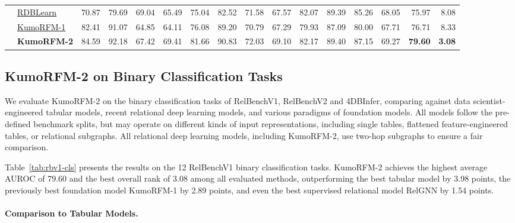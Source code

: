 \documentclass{article}
\newcommand{\onezero}{1\xspace}
\newcommand{\twozero}{2\xspace}
\newcommand{\name}{KumoRFM\xspace}
\newcommand{\nameone}{\name-\onezero}
\newcommand{\nametwo}{\name-\twozero}
\newcommand{\cellfirst}{\cellcolor{green!50!white}}
\newcommand{\cellsecond}{\cellcolor{green!25!white}}
\begin{document}
\begin{table}
{\begin{tabular}{llrrrrrrrrrrrrrr}
& \href{https://arxiv.org/abs/2602.13697}{RDBLearn} & 70.87 & 79.69 & \cellfirst 69.04 & 65.49 & 75.04 & 82.52 & 71.58 & 67.57 & 82.07 & 89.39 & 85.26 & 68.05 & 75.97 & 8.08 \\
& \href{https://kumo.ai/research/kumo_relational_foundation_model.pdf}{\nameone{}} & \cellsecond 82.41 & 91.07 & 64.85 & 64.11 & 76.08 & \cellsecond 89.20 & 70.79 & 67.29 & 79.93 & 87.09 & 80.00 & 67.71 & 76.71 & 8.33 \\
& \textbf{\nametwo{}} & \cellfirst 84.59 & \cellfirst 92.18 & 67.42 & \cellfirst 69.41 & \cellfirst 81.66 & \cellfirst 90.83 & \cellfirst 72.03 & 69.10 & 82.17 & 89.40 & 87.15 & 69.27 & \cellfirst \textbf{79.60} & \cellfirst \textbf{3.08} \\
\bottomrule
\end{tabular}}
\end{table}

\subsection{\nametwo on Binary Classification Tasks}
\label{subsec:binary_classification}

We evaluate \nametwo on the binary classification tasks of RelBenchV1, RelBenchV2 and 4DBInfer, comparing against data scientist-engineered tabular models, recent relational deep learning models, and various paradigms of foundation models.
All models follow the pre-defined benchmark splits, but may operate on different kinds of input representations, including single tables, flattened feature-engineered tables, or relational subgraphs.
All relational deep learning models, including \nametwo, use two-hop subgraphs to ensure a fair comparison.

Table~\ref{tab:rbv1-cls} presents the results on the 12 RelBenchV1 binary classification tasks. \nametwo achieves the highest average AUROC of 79.60 and the best overall rank of 3.08 among all evaluated methods, outperforming the best tabular model by 3.98 points, the previously best foundation model \mbox{\nameone} by 2.89 points, and even the best supervised relational model RelGNN by 1.54 points.

\paragraph{Comparison to Tabular Models.}
\end{document}
